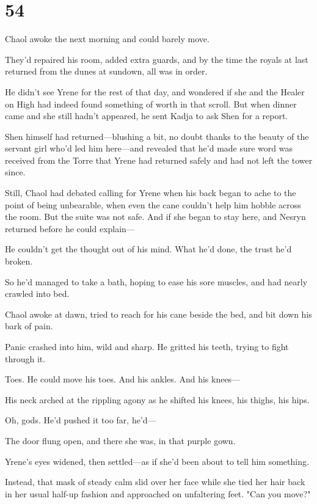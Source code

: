 
\chapter{54}

Chaol awoke the next morning and could barely move.

They'd repaired his room, added extra guards, and by the time the royals at last returned from the dunes at sundown, all was in order.

He didn't see Yrene for the rest of that day, and wondered if she and the Healer on High had indeed found something of worth in that scroll. But when dinner came and she still hadn't appeared, he sent Kadja to ask Shen for a report.

Shen himself had returned---blushing a bit, no doubt thanks to the beauty of the servant girl who'd led him here---and revealed that he'd made sure word was received from the Torre that Yrene had returned safely and had not left the tower since.

Still, Chaol had debated calling for Yrene when his back began to ache to the point of being unbearable, when even the cane couldn't help him hobble across the room. But the suite was not safe. And if she began to stay here, and Nesryn returned before he could explain---

He couldn't get the thought out of his mind. What he'd done, the trust he'd broken.

So he'd managed to take a bath, hoping to ease his sore muscles, and had nearly crawled into bed.

Chaol awoke at dawn, tried to reach for his cane beside the bed, and bit down his bark of pain.

Panic crashed into him, wild and sharp. He gritted his teeth, trying to fight through it.

Toes. He could move his toes. And his ankles. And his knees---

His neck arched at the rippling agony as he shifted his knees, his thighs, his hips.

Oh, gods. He'd pushed it too far, he'd---

The door flung open, and there she was, in that purple gown.

Yrene's eyes widened, then settled---as if she'd been about to tell him something.

Instead, that mask of steady calm slid over her face while she tied her hair back in her usual half-up fashion and approached on unfaltering feet. "Can you move?"

